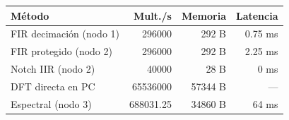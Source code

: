 \begin{tabular}{lrrr}\toprule Método & Mult./s & Memoria & Latencia\\\midrule
FIR decimación (nodo 1) & \num{296000} & \num{292} B & 0.75 ms \\
FIR protegido (nodo 2) & \num{296000} & \num{292} B & 2.25 ms \\
Notch IIR (nodo 2) & \num{40000} & \num{28} B & 0 ms \\
DFT directa en PC & \num{65536000} & \num{57344} B & --- \\
Espectral (nodo 3) & \num{688031.25} & \num{34860} B & 64 ms \\
\bottomrule\end{tabular}
